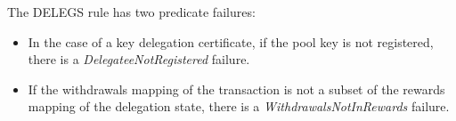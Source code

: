 The DELEGS rule has two predicate failures:
\begin{itemize}
\item In the case of a key delegation certificate, if the pool key is not
  registered, there is a \emph{DelegateeNotRegistered} failure.
\item If the withdrawals mapping of the transaction is not a subset of the
  rewards mapping of the delegation state, there is a
  \emph{WithdrawalsNotInRewards} failure.
\end{itemize}

\clearpage
